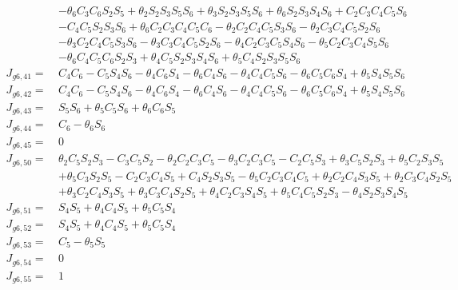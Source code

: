 \documentclass[12pt]{article}
\begin{document}
\begin{CJK}{UTF8}{bsmi}
\begin{equation*}
\begin{split}
			  & - \theta _6C_3C_6S_2S_5 + \theta _2S_2S_3S_5S_6 + \theta _3S_2S_3S_5S_6 + \theta _6S_2S_3S_4S_6 + C_2C_3C_4C_5S_6\\
			  & - C_4C_5S_2S_3S_6 + \theta _6C_2C_3C_4C_5C_6 - \theta _2C_2C_4C_5S_3S_6 - \theta _2C_3C_4C_5S_2S_6\\
			  & - \theta _3C_2C_4C_5S_3S_6 - \theta _3C_3C_4C_5S_2S_6 - \theta _4C_2C_3C_5S_4S_6 - \theta _5C_2C_3C_4S_5S_6\\
			  & - \theta _6C_4C_5C_6S_2S_3 + \theta _4C_5S_2S_3S_4S_6 + \theta _5C_4S_2S_3S_5S_6\\
J_{g6,41} =\  &C_4C_6 - C_5S_4S_6 - \theta _4C_6S_4 - \theta _6C_4S_6 - \theta _4C_4C_5S_6 - \theta _6C_5C_6S_4 + \theta _5S_4S_5S_6\\
J_{g6,42} =\  &C_4C_6 - C_5S_4S_6 - \theta _4C_6S_4 - \theta _6C_4S_6 - \theta _4C_4C_5S_6 - \theta _6C_5C_6S_4 + \theta _5S_4S_5S_6\\
J_{g6,43} =\  &S_5S_6 + \theta _5C_5S_6 + \theta _6C_6S_5\\
J_{g6,44} =\  &C_6 - \theta _6S_6\\
J_{g6,45} =\  &0\\
J_{g6,50} =\  &\theta _2C_5S_2S_3 - C_3C_5S_2 - \theta _2C_2C_3C_5 - \theta _3C_2C_3C_5 - C_2C_5S_3 + \theta _3C_5S_2S_3 + \theta _5C_2S_3S_5\\
			  & + \theta _5C_3S_2S_5 - C_2C_3C_4S_5 + C_4S_2S_3S_5 - \theta _5C_2C_3C_4C_5 + \theta _2C_2C_4S_3S_5 + \theta _2C_3C_4S_2S_5\\
			  & + \theta _3C_2C_4S_3S_5 + \theta _3C_3C_4S_2S_5 + \theta _4C_2C_3S_4S_5 + \theta _5C_4C_5S_2S_3 - \theta _4S_2S_3S_4S_5\\
J_{g6,51} =\  &S_4S_5 + \theta _4C_4S_5 + \theta _5C_5S_4\\
J_{g6,52} =\  &S_4S_5 + \theta _4C_4S_5 + \theta _5C_5S_4\\
J_{g6,53} =\  &C_5 - \theta _5S_5\\
J_{g6,54} =\  &0\\
J_{g6,55} =\  &1\\ 
\end{split}
\end{equation*}


\end{CJK}
\end{document}
